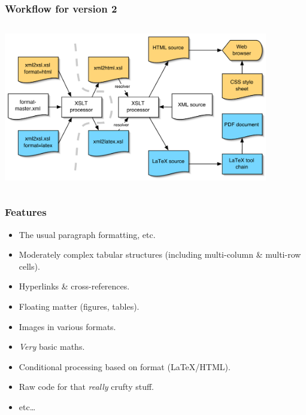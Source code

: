 \documentclass[pdftex,notes=onlyslideswithnotes]{beamer}
\begin{document}
\frame
{
	\frametitle{Workflow for version 2}
	
	\centering
	
	\begin{columns}
	
		\begin{column}{12cm}
	
			\centering
			\includegraphics[height=6.5cm,keepaspectratio]{v2_workflow}
		
		\end{column}
		
	\end{columns}
	
}


\frame
{
	\frametitle{Features}
	
	\begin{itemize}
	
		\item The usual paragraph formatting, etc.
		
		\item Moderately complex tabular structures (including
		multi-column \& multi-row cells).
		
		\item Hyperlinks \& cross-references.
		
		\item Floating matter (figures, tables).
		
		
		\item Images in various formats.
		
		\item \emph{Very} basic maths.
		
		\item Conditional processing based on format (\LaTeX/HTML).
	
		\item Raw code for that \emph{really} crufty stuff.
		
		\item etc\ldots
		
	\end{itemize}
}
\end{document}
